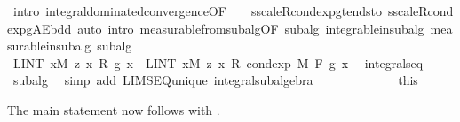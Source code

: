 \begin{isabellebody}
\ {\isacharparenleft}{\kern0pt}intro\ integral{\isacharunderscore}{\kern0pt}dominated{\isacharunderscore}{\kern0pt}convergence{\isacharbrackleft}{\kern0pt}OF\ {\isacharunderscore}{\kern0pt}\ {\isacharunderscore}{\kern0pt}\ {\isacharunderscore}{\kern0pt}\ s{\isacharunderscore}{\kern0pt}scaleR{\isacharunderscore}{\kern0pt}cond{\isacharunderscore}{\kern0pt}exp{\isacharunderscore}{\kern0pt}g{\isacharunderscore}{\kern0pt}tendsto\ s{\isacharunderscore}{\kern0pt}scaleR{\isacharunderscore}{\kern0pt}cond{\isacharunderscore}{\kern0pt}exp{\isacharunderscore}{\kern0pt}g{\isacharunderscore}{\kern0pt}AE{\isacharunderscore}{\kern0pt}bdd{\isacharbrackright}{\kern0pt}{\isacharparenright}{\kern0pt}\ {\isacharparenleft}{\kern0pt}auto\ intro{\isacharcolon}{\kern0pt}\ measurable{\isacharunderscore}{\kern0pt}from{\isacharunderscore}{\kern0pt}subalg{\isacharbrackleft}{\kern0pt}OF\ subalg{\isacharbrackright}{\kern0pt}\ integrable{\isacharunderscore}{\kern0pt}in{\isacharunderscore}{\kern0pt}subalg\ measurable{\isacharunderscore}{\kern0pt}in{\isacharunderscore}{\kern0pt}subalg\ subalg{\isacharparenright}{\kern0pt}\isanewline
\ \ \ \ \ \ \isamarkupfalse%
\ \isamarkupfalse%
\ {\isachardoublequoteopen}LINT\ x{\isacharbar}{\kern0pt}M{\isachardot}{\kern0pt}\ z\ x\ {\isacharasterisk}{\kern0pt}\isactrlsub R\ g\ x\ {\isacharequal}{\kern0pt}\ LINT\ x{\isacharbar}{\kern0pt}M{\isachardot}{\kern0pt}\ z\ x\ {\isacharasterisk}{\kern0pt}\isactrlsub R\ cond{\isacharunderscore}{\kern0pt}exp\ M\ F\ g\ x{\isachardoublequoteclose}\ \isamarkupfalse%
\ integral{\isacharunderscore}{\kern0pt}s{\isacharunderscore}{\kern0pt}eq\ \isamarkupfalse%
\ subalg\ \isamarkupfalse%
\ {\isacharparenleft}{\kern0pt}simp\ add{\isacharcolon}{\kern0pt}\ LIMSEQ{\isacharunderscore}{\kern0pt}unique\ integral{\isacharunderscore}{\kern0pt}subalgebra{}{\isacharparenright}{\kern0pt}\isanewline
\ \ \ \ \isamarkupfalse%
\isanewline
\ \ \isacommand{{\isacharbraceright}{\kern0pt}}\isamarkupfalse%
\isanewline
\ \ \isamarkupfalse%
\ {\isacharasterisk}{\kern0pt}\ {\isacharequal}{\kern0pt}\ this%
\begin{isamarkuptext}%
The main statement now follows with .%
\end{isamarkuptext}\isamarkuptrue%
\ \ \isamarkupfalse%

\end{isabellebody}
